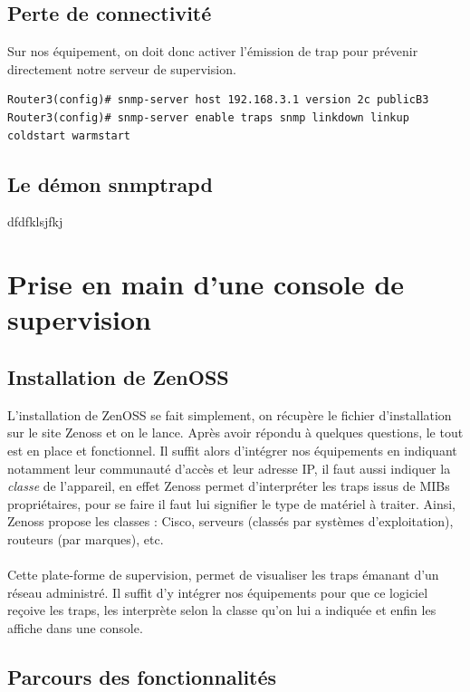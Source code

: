 \documentclass[12pt,a4paper,notitlepage]{article}
\begin{document}
\subsection{Perte de connectivité}
Sur nos équipement, on doit donc activer l'émission de trap pour prévenir directement notre serveur de supervision.

\begin{lstlisting}[title=Activation des traps pour l'état des liens]
Router3(config)# snmp-server host 192.168.3.1 version 2c publicB3
Router3(config)# snmp-server enable traps snmp linkdown linkup coldstart warmstart
\end{lstlisting}

\subsection{Le démon snmptrapd}
dfdfklsjfkj

\section{Prise en main d'une console de supervision}
\subsection{Installation de ZenOSS}
L'installation de ZenOSS se fait simplement, on récupère le fichier d'installation sur le site Zenoss et on le lance. Après avoir répondu à quelques questions, le tout est en place et fonctionnel. Il suffit alors d'intégrer nos équipements en indiquant notamment leur communauté d'accès et leur adresse IP, il faut aussi indiquer la \textit{classe} de l'appareil, en effet Zenoss permet d'interpréter les traps issus de MIBs propriétaires, pour se faire il faut lui signifier le type de matériel à traiter. Ainsi, Zenoss propose les classes : Cisco, serveurs (classés par systèmes d'exploitation), routeurs (par marques), etc.

\paragraph{}Cette plate-forme de supervision, permet de visualiser les traps émanant d'un réseau administré. Il suffit d'y intégrer nos équipements pour que ce logiciel reçoive les traps, les interprète selon la classe qu'on lui a indiquée et enfin les affiche dans une console.

\subsection{Parcours des fonctionnalités}


\end{document}
